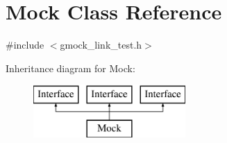 \hypertarget{class_mock}{}\section{Mock Class Reference}
\label{class_mock}


{\ttfamily \#include $<$gmock\+\_\+link\+\_\+test.\+h$>$}

Inheritance diagram for Mock\+:\begin{figure}[H]
\begin{center}
\leavevmode
\includegraphics[height=2.000000cm]{d8/d46/class_mock}
\end{center}
\end{figure}
